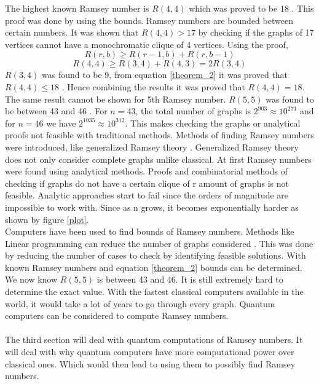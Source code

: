 \documentclass{Assignment}
\begin{document}
The highest known Ramsey number is $R(4,4)$ which was proved to be $18$ \cite{GreenwoodGleason1955}.
This proof was done by using the bounds.
Ramsey numbers are bounded between certain numbers.
It was shown that $R(4,4) > 17$ by checking if the graphs of 17 vertices cannot have a monochromatic clique of 4 vertices. 
Using the proof,
\begin{equation}
	R(r ,b) \geq R(r-1,b)+ R(r,b-1) 
	\label{theorem_2}
\end{equation}
$$R(4,4) \geq R(3,4)+R(4,3) = 2R(3,4)$$
$R(3,4) $ was found to be 9, from equation \eqref{theorem_2} it was proved that $R(4,4) \leq 18$ \cite{GreenwoodGleason1955}.
Hence combining the results it was proved that $R(4,4) = 18$.
The same result cannot be shown for 5th Ramsey number.
$R(5,5)$ was found to be between 43 \cite{Exoo1993} and 46 \cite{angeltveit2024r55le46}.
For $n= 43$, the total number of graphs is $2^{903} \approx 10^{271}$ and for $n=46$ we have $2^{1035}\approx10^{312}$.
This makes checking the graphs or analytical proofs not feasible with traditional methods.
Methods of finding Ramsey numbers were introduced, like generalized Ramsey theory \cite{burr1981generalized}. 
Generalized Ramsey theory does not only consider complete graphs unlike classical.
At first Ramsey numbers were found using analytical methods.
Proofs and combinatorial methods of checking if graphs do not have a certain clique of r amount of graphs is not feasible.
Analytic approaches start to fail since the orders of magnitude are impossible to work with.
Since as n grows, it becomes exponentially harder as shown by figure \ref{plot}.
\\
Computers have been used to find bounds of Ramsey numbers.
Methods like Linear programming can reduce the number of graphs considered \cite{angeltveit2024r55le46}.
This was done by reducing the number of cases to check by identifying feasible solutions. 
With known Ramsey numbers and equation \eqref{theorem_2} bounds can be determined.
We now know $R(5,5)$ is between 43 and 46.
It is still extremely hard to determine the exact value.
With the fastest classical computers available in the world, it would take a lot of years to go through every graph.
Quantum computers can be considered to compute Ramsey numbers.
\\\\
The third section will deal with quantum computations of Ramsey numbers.
It will deal with why quantum computers have more computational power over classical ones.
Which would then lead to using them to possibly find Ramsey numbers.
\end{document}
